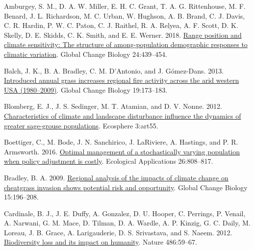\documentclass[
  12pt,
]{article}
\newlength{\cslhangindent}
\newlength{\cslentryspacingunit} %
\newenvironment{CSLReferences}[2] %
 {%
  \setlength{\parindent}{0pt}
  \ifodd #1
  \let\oldpar\par
  \def\par{\hangindent=\cslhangindent\oldpar}
  \fi
  \setlength{\parskip}{#2\cslentryspacingunit}
 }%
 {}
\begin{document}
\setlength{\parindent}{-0.2in}
\setlength{\leftskip}{0.2in}
\setlength{\parskip}{8pt}

\noindent

\hypertarget{refs}{}
\begin{CSLReferences}{1}{0}
\leavevmode{}%
Amburgey, S. M., D. A. W. Miller, E. H. C. Grant, T. A. G. Rittenhouse, M. F. Benard, J. L. Richardson, M. C. Urban, W. Hughson, A. B. Brand, C. J. Davis, C. R. Hardin, P. W. C. Paton, C. J. Raithel, R. A. Relyea, A. F. Scott, D. K. Skelly, D. E. Skidds, C. K. Smith, and E. E. Werner. 2018. \href{https://doi.org/10.1111/gcb.13817}{Range position and climate sensitivity: {The} structure of among-population demographic responses to climatic variation}. Global Change Biology 24:439--454.

\leavevmode{}%
Balch, J. K., B. A. Bradley, C. M. D'Antonio, and J. Gómez-Dans. 2013. \href{https://doi.org/10.1111/gcb.12046}{Introduced annual grass increases regional fire activity across the arid western {USA} (1980--2009)}. Global Change Biology 19:173--183.

\leavevmode{}%
Blomberg, E. J., J. S. Sedinger, M. T. Atamian, and D. V. Nonne. 2012. \href{https://doi.org/10.1890/ES11-00304.1}{Characteristics of climate and landscape disturbance influence the dynamics of greater sage-grouse populations}. Ecosphere 3:art55.

\leavevmode{}%
Boettiger, C., M. Bode, J. N. Sanchirico, J. LaRiviere, A. Hastings, and P. R. Armsworth. 2016. \href{https://doi.org/10.1890/15-0236}{Optimal management of a stochastically varying population when policy adjustment is costly}. Ecological Applications 26:808--817.

\leavevmode{}%
Bradley, B. A. 2009. \href{https://doi.org/10.1111/j.1365-2486.2008.01709.x}{Regional analysis of the impacts of climate change on cheatgrass invasion shows potential risk and opportunity}. Global Change Biology 15:196--208.

\leavevmode{}%
Cardinale, B. J., J. E. Duffy, A. Gonzalez, D. U. Hooper, C. Perrings, P. Venail, A. Narwani, G. M. Mace, D. Tilman, D. A. Wardle, A. P. Kinzig, G. C. Daily, M. Loreau, J. B. Grace, A. Larigauderie, D. S. Srivastava, and S. Naeem. 2012. \href{https://doi.org/10.1038/nature11148}{Biodiversity loss and its impact on humanity}. Nature 486:59--67.


\end{CSLReferences}
\end{document}
